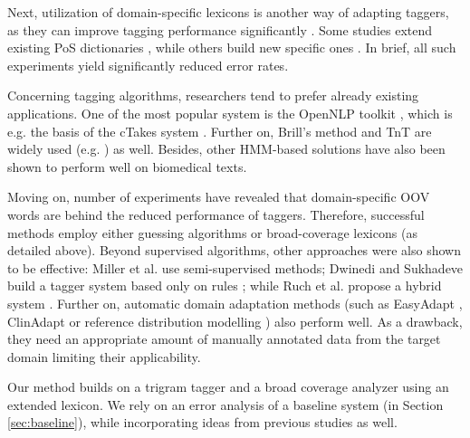 Next, utilization of domain-specific lexicons is another way of adapting taggers, as they can improve tagging performance significantly \cite{coden2005domain,ruch2000minimal}. 
Some studies extend existing PoS dictionaries \cite{divita2006dtagger}, while others build new specific ones \cite{Smith2006}. 
In brief, all such experiments yield significantly reduced error rates. 

Concerning tagging algorithms, researchers tend to prefer already existing applications. 
One of the most popular system is the OpenNLP toolkit \cite{Baldridge2002}, which is e.g. the basis of the cTakes system \cite{Savova2010}.
Further on, Brill’s method \cite{Brill1992} and TnT \cite{Brants2000} are widely used (e.g. \cite{hahn2004tagging,Savova2010,pestian2004development}) as well. 
Besides, other HMM-based solutions have also been shown to perform well \cite{barrett2011token,coden2005domain,divita2006dtagger,hahn2004tagging,pakhomov2006developing,rost2008lessons,ruch2000minimal} on biomedical texts. 

Moving on, number of experiments have revealed \cite{ferraro2013improving,ruch2000minimal,Smith2006} that domain-specific OOV words are behind the reduced performance of taggers. 
Therefore, successful methods employ either guessing algorithms \cite{barrett2011token,divita2006dtagger,rost2008lessons,ruch2000minimal,Smith2006} or broad-coverage lexicons (as detailed above). 
Beyond supervised algorithms, other approaches were also shown to be effective: Miller et al. \cite{miller2007building} use semi-supervised methods;
Dwinedi and Sukhadeve build a tagger system based only on rules \cite{dwivedi8rule}; while Ruch et al. propose a hybrid system \cite{ruch2000minimal}. 
Further on, automatic domain adaptation methods (such as EasyAdapt \cite{daume2007frustratingly}, ClinAdapt \cite{ferraro2013improving} 
or reference distribution modelling  \cite{tateisi2006subdomain}) also perform well. As a drawback, they need an appropriate amount of manually annotated data from the target domain limiting their applicability. 

Our method builds on a trigram tagger and a broad coverage analyzer using an extended lexicon. 
We rely on an error analysis of a baseline system (in Section \ref{sec:baseline}), while  incorporating ideas from previous studies as well.

